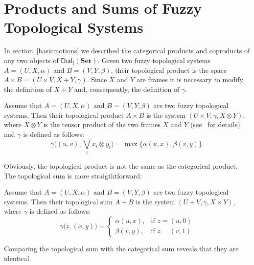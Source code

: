 \documentclass[11pt]{article}
\newenvironment{definition}[1][Definition]{\begin{trivlist}
\item[\hskip \labelsep {\bfseries #1}]}{\end{trivlist}}
\begin{document}
\section{Products and Sums of Fuzzy Topological Systems}
In section~\ref{basic:notions} we described the categorical products and coproducts
of any two objects of $\mathsf{Dial}_{\mathrm{I}}(\mathbf{Set})$. Given two fuzzy 
topological systems $A=(U, X, \alpha)$ and $B= (V, Y, \beta)$, their topological
product is the space $A\times B= (U\times V, X+ Y, \gamma)$. Since $X$ and $Y$ are frames
it is necessary to modify the definition of $X+Y$ and, consequently, the definition of
$\gamma$. 
\begin{definition}
Assume that $A=(U, X, \alpha)$ and $B= (V, Y, \beta)$ are two fuzzy topological
systems. Then their topological product $A\times B$ is the system
$(U\times V,\gamma,X\otimes Y)$, where $X\otimes Y$ is the tensor product
of the two frames $X$ and $Y$ (see~\cite[pp.~80--85]{vickers90} for details)
and $\gamma$ is defined as follows:
\begin{displaymath}
\gamma\bigl((u,v),\bigvee_{i} x_{i}\otimes y_{i}\bigr)=
\max\bigl\{\alpha(u,x),\beta(v,y)\bigr\}.
\end{displaymath}
\end{definition}
Obviously, the topological product is not the same as the categorical product. 
The topological sum is more straigthtforward:
\begin{definition}
Assume that $A=(U, X, \alpha)$ and $B= (V, Y, \beta)$ are two fuzzy topological
systems. Then their topological sum $A + B$ is the system
$(U+V,\gamma,X\times Y)$, where $\gamma$ is defined as follows:
\begin{displaymath}
\gamma\bigl(z,(x,y)\bigr)=\left\{\begin{array}{ll}
                                 \alpha(u,x),& \text{if $z=(u,0)$}\\
                                 \beta(v,y), & \text{if $z=(v,1)$}
                                 \end{array}
                           \right.
\end{displaymath}
\end{definition}
Comparing the topological sum with the categorical sum reveals that they are identical.
\end{document}
